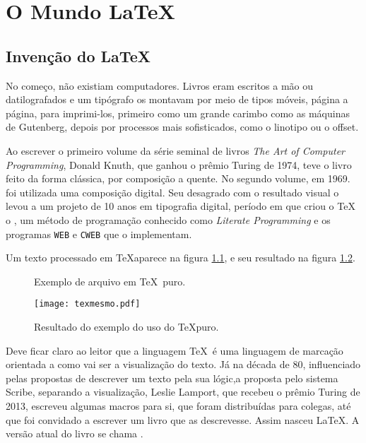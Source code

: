 \chapter{O Mundo \LaTeX}
\label{chap:mundo}

\section{Invenção do \LaTeX}

No começo, não existiam computadores. Livros eram escritos a mão ou datilografados e um tipógrafo os montavam por meio de tipos móveis, página a página, para imprimi-los, primeiro como um grande carimbo como as máquinas de Gutenberg, depois por processos mais sofisticados, como o linotipo ou o offset.

Ao escrever o primeiro volume da série seminal de livros \textit{The Art of Computer Programming}, Donald Knuth, que ganhou o prêmio Turing de 1974, teve o livro feito da forma clássica, por composição a quente. No segundo volume, em 1969. foi utilizada uma composição digital. Seu desagrado com o resultado visual o levou a um projeto de 10 anos em tipografia digital, período em que criou o \TeX\, o , um método de programação conhecido como \textit{Literate Programming} e os programas \texttt{WEB} e \texttt{CWEB} que o implementam.

Um texto processado em \TeX aparece na figura \ref{fig:tex:s}, e seu resultado na figura \ref{fig:texmesmo}.

\begin{figure}[hbt]
    \centering
    
    \caption[Exemplo de arquivo em \TeX\ puro.]{Exemplo de arquivo em \TeX\ puro.}
    \label{fig:tex:s}
\end{figure}


\begin{figure}[hbt]
    \centering
    \texttt{[image: texmesmo.pdf]}
    \caption[Resultado do exemplo do uso do \TeX puro.]{Resultado do exemplo do uso do \TeX puro.}
    \label{fig:texmesmo}
\end{figure}

Deve ficar claro ao leitor que a linguagem \TeX\ é uma linguagem de marcação orientada a como vai ser a visualização do texto. Já na década de 80,  influenciado pelas propostas de descrever um texto pela sua lógic,a proposta pelo sistema Scribe\parencite{Reid:1980}, separando a visualização, Leslie Lamport, que recebeu o prêmio Turing de 2013, escreveu algumas macros para si, que foram distribuídas para colegas, até que foi convidado a escrever um livro que as descrevesse. Assim nasceu \LaTeX\cite{Mittelbach:1999}. A versão atual do livro se chama \parencite{latex:userguide}.

